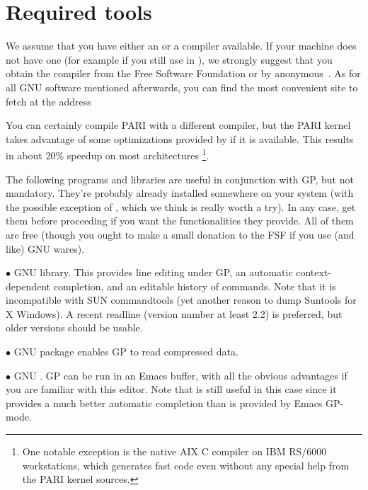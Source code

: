 
\def\tocwrite#1{}
\section{Required tools}

We assume that you have either an  or a  compiler
available. If your machine does not have one (for example if you still use
 in ), we strongly suggest that you obtain the
 compiler from the Free Software Foundation or by
anonymous~. As for all GNU software mentioned afterwards, you can
find the most convenient site to fetch  at the address


\noindent
You can certainly compile PARI with a different compiler, but the PARI
kernel takes advantage of some optimizations provided by  if it is
available. This results in about 20\% speedup on most architectures%
\footnote*{One notable exception is the native AIX C compiler on IBM
RS/6000 workstations, which generates fast code even without any special
help from the PARI kernel sources.}.

 The following programs and libraries are useful
in conjunction with GP, but not mandatory. They're probably already installed
somewhere on your system (with the possible exception of ,
which we think is really worth a try). In any case, get them before
proceeding if you want the functionalities they provide. All of them are free
(though you ought to make a small donation to the FSF if you use (and like)
GNU wares).

  $\bullet$ GNU  library. This provides line editing under GP,
an automatic context-dependent completion, and an editable history of
commands. Note that it is incompatible with SUN commandtools (yet another
reason to dump Suntools for X Windows). A recent readline (version number at
least 2.2) is preferred, but older versions should be usable.

  $\bullet$ GNU  package enables GP to read
compressed data.

  $\bullet$ GNU . GP can be run in an Emacs buffer, with all the
obvious advantages if you are familiar with this editor. Note that
 is still useful in this case since it provides a much better
automatic completion than is provided by Emacs GP-mode.

